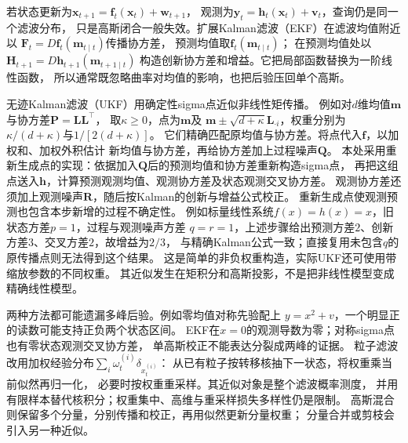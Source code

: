 若状态更新为$\bm x_{t+1}=\bm f_t(\bm x_t)+\bm w_{t+1}$，
观测为$\bm y_t=\bm h_t(\bm x_t)+\bm v_t$，查询仍是同一个滤波分布，
只是高斯闭合一般失效。扩展Kalman滤波（EKF）在滤波均值附近以
$\bm F_t=D\bm f_t(\bm m_{t\mid t})$传播协方差，
预测均值取$\bm f_t(\bm m_{t\mid t})$；
在预测均值处以$\bm H_{t+1}=D\bm h_{t+1}(\bm m_{t+1\mid t})$
构造创新协方差和增益。它把局部函数替换为一阶线性函数，
所以通常既忽略曲率对均值的影响，也把后验压回单个高斯。

无迹Kalman滤波（UKF）用确定性sigma点近似非线性矩传播。
例如对$d$维均值$\bm m$与协方差$\bm P=\bm L\bm L^\top$，
取$\kappa\geq0$，点为$\bm m$及
$\bm m\pm\sqrt{d+\kappa}\bm L_{\cdot i}$，权重分别为
$\kappa/(d+\kappa)$与$1/[2(d+\kappa)]$。
它们精确匹配原均值与协方差。将点代入$\bm f$，以加权和、加权外积估计
新均值与协方差，再给协方差加上过程噪声$\bm Q$。
本处采用重新生成点的实现：依据加入$\bm Q$后的预测均值和协方差重新构造sigma点，
再把这组点送入$\bm h$，计算预测观测均值、观测协方差及状态观测交叉协方差。
观测协方差还须加上观测噪声$\bm R$，随后按Kalman的创新与增益公式校正。
重新生成点使观测预测也包含本步新增的过程不确定性。
例如标量线性系统$f(x)=h(x)=x$，旧状态方差$p=1$，过程与观测噪声方差
$q=r=1$，上述步骤给出预测方差$2$、创新方差$3$、交叉方差$2$，故增益为$2/3$，
与精确Kalman公式一致；直接复用未包含$q$的原传播点则无法得到这个结果。
这是简单的非负权重构造，实际UKF还可使用带缩放参数的不同权重。
其近似发生在矩积分和高斯投影，不是把非线性模型变成精确线性模型。

两种方法都可能遗漏多峰后验。例如零均值对称先验配上
$y=x^2+v$，一个明显正的读数可能支持正负两个状态区间。
EKF在$x=0$的观测导数为零；对称sigma点也有零状态观测交叉协方差，
单高斯校正不能表达分裂成两峰的证据。
粒子滤波改用加权经验分布$\sum_i\omega_t^{(i)}\delta_{x_t^{(i)}}$：
从已有粒子按转移核抽下一状态，将权重乘当前似然再归一化，
必要时按权重重采样。其近似对象是整个滤波概率测度，
并用有限样本替代核积分；权重集中、高维与重采样损失多样性仍是限制。
高斯混合则保留多个分量，分别传播和校正，再用似然更新分量权重；
分量合并或剪枝会引入另一种近似。

